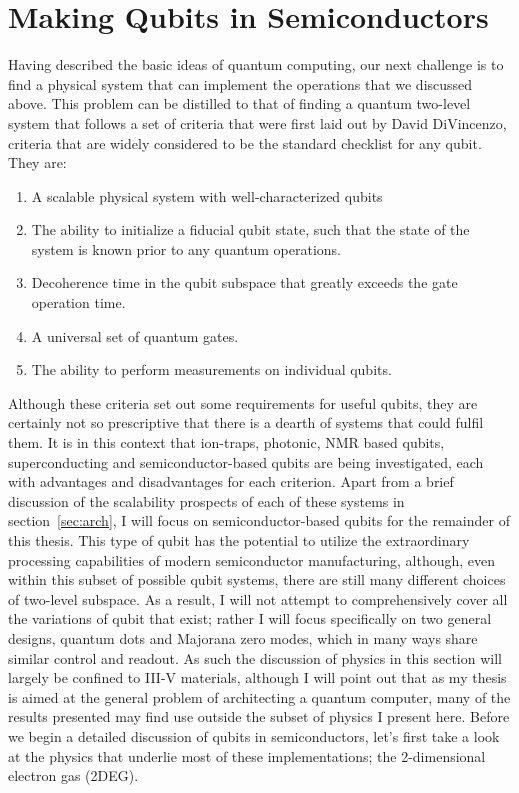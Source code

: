 
\section{Making Qubits in Semiconductors}
\label{sec:qcinsm}
Having described the basic ideas of quantum computing, our next challenge is to find a physical system that
can implement the operations that we discussed above. This problem can be distilled to that
of finding a quantum two-level system that follows a set of criteria that were first laid out by David
DiVincenzo, criteria that are widely considered to be the standard checklist for any qubit\cite{divincenzo_crit}. They are:
\begin{enumerate}
  \item A scalable physical system with well-characterized qubits
  \item The ability to initialize a fiducial qubit state, such that the state of the system is known prior
    to any quantum operations.
  \item Decoherence time in the qubit subspace that greatly exceeds the gate operation time.
  \item A universal set of quantum gates.
  \item The ability to perform measurements on individual qubits.
\end{enumerate}
Although these criteria set out some requirements for useful qubits, they are certainly not so prescriptive
that there is a dearth of systems that could fulfil them. It is in this context that ion-traps, photonic,
NMR based qubits, superconducting and semiconductor-based qubits are being investigated, each with advantages
and disadvantages for each criterion. Apart from a brief discussion of the scalability prospects of each of these systems
in section~\ref{sec:arch}, I will focus on semiconductor-based qubits for the remainder of this thesis. This type
of qubit has the potential to utilize the extraordinary processing capabilities of modern semiconductor manufacturing,
although, even within this subset of possible qubit systems, there are still many different
choices of two-level subspace. As a result, I will not attempt to comprehensively cover all the variations
of qubit that exist; rather I will focus specifically on two general designs, quantum dots and Majorana zero modes,
which in many ways share similar control and readout. As such the discussion of physics in this section will
largely be confined to III-V materials, although I will point out that as my thesis is aimed at the general
problem of architecting a quantum computer, many of the results presented may find use outside the subset of physics
I present here. Before we begin a detailed discussion of qubits in semiconductors, let's first take a look
at the physics that underlie most of these implementations; the 2-dimensional electron gas (2DEG).

